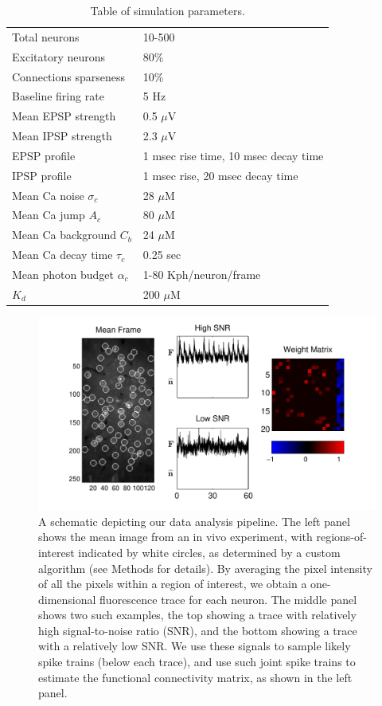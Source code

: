 \begin{table}[h!b!p!]
\caption{Table of simulation parameters.}\label{table:caparm}
\begin{tabular}{ll}
\hline
Total neurons & 10-500 \\
Excitatory neurons & 80\% \\
Connections sparseness & 10\% \\
Baseline firing rate & 5  Hz\\
Mean EPSP strength & 0.5 $\mu$V \\
Mean IPSP strength & 2.3 $\mu$V\\
EPSP profile & 1 msec rise time, 10 msec decay time \\
IPSP profile & 1 msec rise, 20 msec decay time \\
\hline
Mean Ca noise $\sigma_c$ & 28 $\mu$M \\
Mean Ca jump $A_c$ & 80 $\mu$M \\
Mean Ca background $C_b$ & 24 $\mu$M \\
Mean Ca decay time $\tau_c$ & 0.25 sec \\
Mean photon budget $\alpha_c$ & 1-80 Kph/neuron/frame \\
$K_d$ & 200 $\mu$M \\
\hline
\end{tabular}
\end{table}


\begin{figure}[h]
\centering
\includegraphics[width=\hsize]{../figs/data_example}
\caption{A schematic depicting our data analysis pipeline.  The left panel shows the mean image from an in vivo experiment, with regions-of-interest indicated by white circles, as determined by a custom algorithm (see Methods for details).  By averaging the pixel intensity of all the pixels within a region of interest, we obtain a one-dimensional fluorescence trace for each neuron.  The middle panel shows two such examples, the top showing a trace with relatively high signal-to-noise ratio (SNR), and the bottom showing a trace with a relatively low SNR.  We use these signals to sample likely spike trains (below each trace), and use such joint spike trains to estimate the functional connectivity matrix, as shown in the left panel.}
\label{fig:data_example}
\end{figure}

